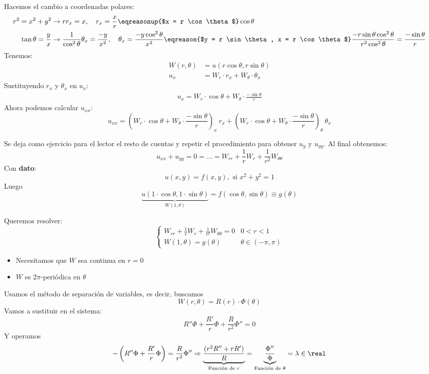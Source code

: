 		Hacemos el cambio a coordenadas polares:
		\begin{align*}
		 r^2 = x^2 + y^2  &\rightarrow rr_x = x , \quad r_x = \frac{x}{r} \eqreasonup{$x = r \cos \theta $} \cos \theta \\
		 \tan \theta = \frac{y}{x}  &\rightarrow \frac{1}{\cos^2 \theta} \theta_x = \frac{-y}{x^2}, \quad \theta_x = \frac{-y \cos^2\theta}{x^2} \eqreason{$y = r \sin \theta, x = r \cos \theta$} \frac{-r \sin \theta \cos^2 \theta}{r^2 \cos^2 \theta} = \frac{- \sin \theta}{r}
		\end{align*}
		Tenemos:
		\begin{align*}
			W(r, \theta) &= u(r \cos \theta, r \sin \theta)\\
			u_x &= W_r \cdot r_x + W_\theta \cdot \theta_x
		\end{align*}
		Sustituyendo $r_x$ y $\theta_x$ en $u_x$:
		\begin{align*}
			u_x = W_r \cdot \cos \theta + W_\theta \cdot \frac{- \sin \theta}{r}
		\end{align*}
		Ahora podemos calcular $u_{xx}$:
		$$ u_{xx} = (W_r \cdot \cos \theta + W_\theta \cdot \frac{- \sin \theta}{r})_x \ r_x + (W_r \cdot \cos \theta + W_\theta \cdot \frac{- \sin \theta}{r})_\theta \ \theta_x$$

		Se deja como ejercicio para el lector el resto de cuentas y repetir el procedimiento para obtener $u_y$ y $u_{yy}$. Al final obtenemos:
		$$ u_{xx} + u_{yy} = 0 = \dots = W_{rr} + \frac{1}{r}W_r + \frac{1}{r^2}W_{\theta\theta}$$
		Con \textbf{dato}:
		\[ u(x,y) = f(x,y), \text{ si } x^2 + y^2 = 1\]
		Luego
		\[ \underbrace{u(1 \cdot \cos \theta,1 \cdot \sin \theta)}_{W(1,\theta)} = f(\cos \theta, \sin \theta) \equiv g(\theta)\]

		Queremos resolver:
		\[
			\begin{cases}
			W_{rr} + \frac{1}{r} W_r + \frac{1}{r^2} W_{\theta \theta} = 0 & 0 < r < 1 \\
			W(1, \theta) = g(\theta) & \theta \in (-\pi,\pi)
			\end{cases}
		\]

		\begin{itemize}
			\item Necesitamos que $W$ sea continua en $r=0$
			\item $W$ es $2\pi$-periódica en $\theta$
		\end{itemize}

		Usamos el método de separación de variables, es decir, buscamos $$W(r, \theta) = R(r)\cdot \Phi(\theta)$$
		Vamos a sustituir en el sistema:
		\[R''\Phi + \frac{R'}{r}\Phi + \frac{R}{r^2} \Phi'' = 0 \]
		Y operamos
		\[ - \left( R'' \Phi + \frac{R'}{r}\Phi \right) = \frac{R}{r^2} \Phi'' \Rightarrow \underbrace{\frac{(r^2R''+rR')}{R}}_{\text{Función de }r} = \underbrace{\frac{\Phi''}{\Phi}}_{\text{Función de }\theta} = \lambda \in \real \]

